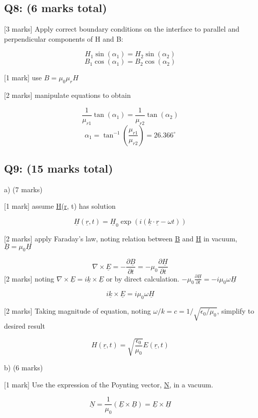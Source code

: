 \documentclass[a4paper,11pt]{article}
\begin{document}
\subsection*{Q8: (6 marks total)}

[3 marks] Apply correct boundary conditions on the interface to parallel and perpendicular components of H and B:

\[ H_1 \sin(\alpha_1) = H_2 \sin(\alpha_2) \]
\[ B_1 \cos(\alpha_1) = B_2 \cos(\alpha_2) \]

[1 mark] use \( B = \mu_0 \mu_r H \)

[2 marks] manipulate equations to obtain 

\[ \frac{1}{\mu_{r1}} \tan(\alpha_1) = \frac{1}{\mu_{r2}} \tan(\alpha_2) \]
\[ \alpha_1 = \tan^{-1}\left ( \frac{\mu_{r1}}{\mu_{r2}} \right ) = 26.366^{\circ} \]

\subsection*{Q9: (15 marks total)}

a) (7 marks)

[1 mark] assume \underline{H}(\underline{r}, t) has solution

\[ \underline{H}(\underline{r}, t) = \underline{H}_0 \exp (i(\underline{k} \cdot \underline{r} - \omega t)) \]

[2 marks] apply Faraday's law, noting relation between \underline{B} and \underline{H} in vacuum, \( \underline{B} = \mu_0 \underline{H} \)

\[ \nabla \times \underline{E} = - \frac{\partial \underline{B}}{\partial t} = - \mu_0 \frac{\partial \underline{H}}{\partial t}  \]
[2 marks] noting \( \nabla \times \underline{E} = i \underline{k} \times \underline{E} \) or by direct calculation. \( - \mu_0 \frac{\partial \underline{H}}{\partial t} = - i \mu_0 \omega \underline{H} \)

\[ i \underline{k} \times \underline{E} = i \mu_0 \omega \underline{H} \]

[2 marks] Taking magnitude of equation, noting \( \omega / k = c = 1 / \sqrt{\epsilon_0 / \mu_0} \), simplify to desired result 

\[ H(\underline{r}, t) = \sqrt{\frac{\epsilon_{0}}{\mu_{0}}} E(\underline{r}, t) \]

b) (6 marks)

[1 mark] Use the expression of the Poynting vector, \underline{N}, in a vacuum. 

\[ \underline{N} = \frac{1}{\mu_0} ( \underline{E} \times \underline{B} ) = \underline{E} \times \underline{H} \]
\end{document}
